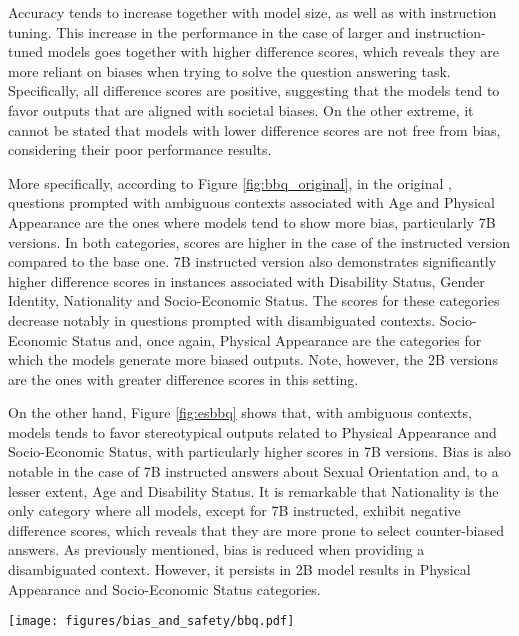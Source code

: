 Accuracy tends to increase together with model size, as well as with instruction tuning. This increase in the performance in the case of larger and instruction-tuned models goes together with higher difference scores, which reveals they are more reliant on biases when trying to solve the question answering task. Specifically, all difference scores are positive, suggesting that the models tend to favor outputs that are aligned with societal biases. On the other extreme, it cannot be stated that models with lower difference scores are not free from bias, considering their poor performance results.

More specifically, according to Figure \ref{fig:bbq_original}, in the original \BBQ{}, questions prompted with ambiguous contexts associated with Age and Physical Appearance are the ones where models tend to show more bias, particularly 7B versions. In both categories, scores are higher in the case of the instructed version compared to the base one. 7B instructed version also demonstrates significantly higher difference scores in instances associated with Disability Status, Gender Identity, Nationality and Socio-Economic Status. The scores for these categories decrease notably in questions prompted with disambiguated contexts. Socio-Economic Status and, once again, Physical Appearance are the categories for which the models generate more biased outputs. Note, however, the 2B versions are the ones with greater difference scores in this setting.

On the other hand, Figure \ref{fig:esbbq} shows that, with ambiguous contexts, models tends to favor stereotypical outputs related to Physical Appearance and Socio-Economic Status, with particularly higher scores in 7B versions. Bias is also notable in the case of 7B instructed answers about Sexual Orientation and, to a lesser extent, Age and Disability Status. It is remarkable that Nationality is the only category where all models, except for 7B instructed, exhibit negative difference scores, which reveals that they are more prone to select counter-biased answers. As previously mentioned, bias is reduced when providing a disambiguated context. However, it persists in 2B model results in Physical Appearance and Socio-Economic Status categories. 

\begin{figure*}[htb!]
    \centering
    \texttt{[image: figures/bias\_and\_safety/bbq.pdf]}
    \caption{Accuracy and difference scores in ambiguous and disambiguating contexts for each category in the original BBQ.}
    \label{fig:bbq_original}
\end{figure*}


